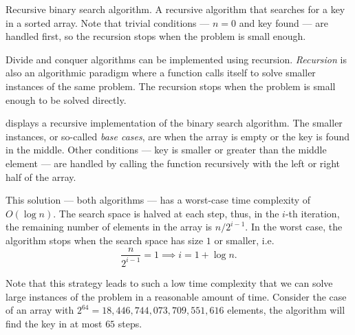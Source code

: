 \begin{algobox}[label=alg:bsearch2]{Recursive binary search algorithm.}
  \tcblower
  A recursive algorithm that searches for a key in a sorted array.  Note that trivial
  conditions --- $n = 0$ and key found --- are handled first, so the recursion stops
  when the problem is small enough.
\end{algobox}

Divide and conquer algorithms can be implemented using recursion.  \emph{Recursion}
is also an algorithmic paradigm where a function calls itself to solve smaller instances of the
same problem.  The recursion stops when the problem is small enough to be solved directly.

 displays a recursive implementation of the binary search algorithm.
The smaller instances, or so-called \emph{base cases}, are when the array is empty or the key
is found in the middle.  Other conditions --- key is smaller or greater than the middle element ---
are handled by calling the function recursively with the left or right half of the array.


This solution --- both algorithms --- has a worst-case time complexity of $O(\log n)$. The
search space is halved at each step, thus, in the $i$-th iteration, the remaining number
of elements in the array is $n / 2^{i-1}$.  In the worst case, the algorithm stops when the
search space has size $1$ or smaller, i.e.
\[
  \frac{n}{2^{i-1}} = 1 \implies
  i = 1 + \log n\text{.}
\]

Note that this strategy leads to such a low time complexity that we can solve large instances
of the problem in a reasonable amount of time.  Consider the case of an array with $2^{64}
= 18{,}446{,}744{,}073{,}709{,}551{,}616$ elements, the algorithm will find the key in at most $65$
steps.

